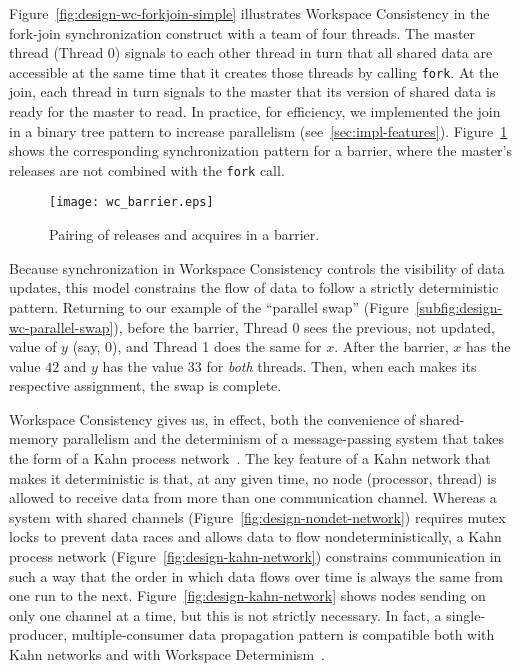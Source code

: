 Figure~\ref{fig:design-wc-forkjoin-simple} illustrates Workspace Consistency in the fork-join synchronization construct with a team of four threads.  The master thread (Thread 0) signals to each other thread in turn that all shared data are accessible at the same time that it creates those threads by calling \texttt{fork}.  At the join, each thread in turn signals to the master that its version of shared data is ready for the master to read.  In practice, for efficiency, we implemented the join in a binary tree pattern to increase parallelism (see~\ref{sec:impl-features}).  Figure~\ref{fig:design-wc-barrier} shows the corresponding synchronization pattern for a barrier, where the master's releases are not combined with the \texttt{fork} call.

\begin{figure}[tbp]
\begin{center}
\texttt{[image: wc\_barrier.eps]}
\caption{Pairing of releases and acquires in a barrier.}
\label{fig:design-wc-barrier}
\end{center}
\end{figure}
%
Because synchronization in Workspace Consistency controls the visibility of data updates, this model constrains the flow of data to follow a strictly deterministic pattern.  Returning to our example of the ``parallel swap'' (Figure~\ref{subfig:design-wc-parallel-swap}), before the barrier, Thread 0 sees the previous, not updated, value of $y$ (say, $0$), and Thread 1 does the same for $x$.  After the barrier, $x$ has the value $42$ and $y$ has the value $33$ for \textit{both} threads.  Then, when each makes its respective assignment, the swap is complete.

Workspace Consistency gives us, in effect, both the convenience of shared-memory parallelism and the determinism of a message-passing system that takes the form of a Kahn process network~\cite{kahn74semantics}.  The key feature of a Kahn network that makes it deterministic is that, at any given time, no node (processor, thread) is allowed to receive data from more than one communication channel.  Whereas a system with shared channels (Figure~\ref{fig:design-nondet-network}) requires mutex locks to prevent data races and allows data to flow nondeterministically, a Kahn process network (Figure~\ref{fig:design-kahn-network}) constrains communication in such a way that the order in which data flows over time is always the same from one run to the next.  Figure~\ref{fig:design-kahn-network} shows nodes sending on only one channel at a time, but this is not strictly necessary.  In fact, a single-producer, multiple-consumer data propagation pattern is compatible both with Kahn networks and with Workspace Determinism~\cite{aviram11workspace}.

